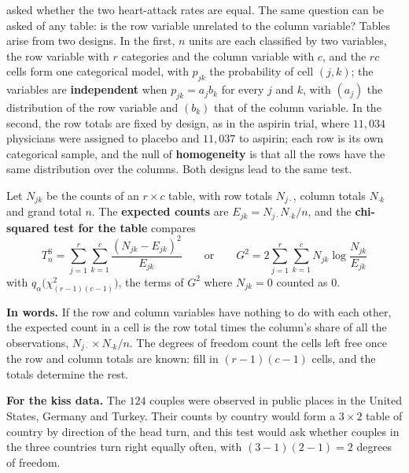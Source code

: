  asked whether the two heart-attack rates are equal.
The same question can be asked of any table: is the row variable unrelated to the column variable?
Tables arise from two designs.
In the first, $n$ units are each classified by two variables, the row variable with $r$ categories and the column variable with $c$, and the $rc$ cells form one categorical model, with $p_{jk}$ the probability of cell $(j, k)$; the variables are \textbf{independent} when $p_{jk} = a_jb_k$ for every $j$ and $k$, with $(a_j)$ the distribution of the row variable and $(b_k)$ that of the column variable.
In the second, the row totals are fixed by design, as in the aspirin trial, where $11{,}034$ physicians were assigned to placebo and $11{,}037$ to aspirin; each row is its own categorical sample, and the null of \textbf{homogeneity} is that all the rows have the same distribution over the columns.
Both designs lead to the same test.

\begin{definition}
\label{def:gof-table}
Let $N_{jk}$ be the counts of an $r \times c$ table, with row totals $N_{j\cdot}$, column totals $N_{\cdot k}$ and grand total $n$.
The \textbf{expected counts} are $E_{jk} = N_{j\cdot}N_{\cdot k}/n$, and the \textbf{chi-squared test for the table} compares
\[
T^{\mathrm{S}}_n = \sum_{j=1}^r\sum_{k=1}^c\frac{(N_{jk} - E_{jk})^2}{E_{jk}} \qquad\text{or}\qquad G^2 = 2\sum_{j=1}^r\sum_{k=1}^c N_{jk}\log\frac{N_{jk}}{E_{jk}}
\]
with $q_\alpha\big(\chi^2_{(r-1)(c-1)}\big)$, the terms of $G^2$ where $N_{jk} = 0$ counted as $0$.
\end{definition}

\begin{inwords}
\textbf{In words.} If the row and column variables have nothing to do with each other, the expected count in a cell is the row total times the column's share of all the observations, $N_{j\cdot} \times N_{\cdot k}/n$. The degrees of freedom count the cells left free once the row and column totals are known: fill in $(r - 1)(c - 1)$ cells, and the totals determine the rest.
\par\smallskip
\textbf{For the kiss data.} The $124$ couples were observed in public places in the United States, Germany and Turkey. Their counts by country would form a $3 \times 2$ table of country by direction of the head turn, and this test would ask whether couples in the three countries turn right equally often, with $(3 - 1)(2 - 1) = 2$ degrees of freedom.
\end{inwords}

